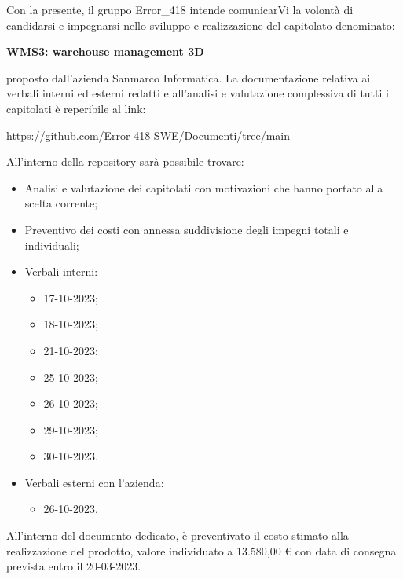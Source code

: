 \documentclass[a4paper, twoside]{article}
\begin{document}
\newpage %



\noindent
Con la presente, il gruppo Error\_418 intende comunicarVi la volontà di candidarsi e impegnarsi nello sviluppo e realizzazione del capitolato denominato:
\begin{center}
\textbf{WMS3: warehouse management 3D}
\end{center}
proposto dall'azienda Sanmarco Informatica. La documentazione relativa ai verbali interni ed 
esterni redatti e all'analisi e valutazione complessiva di tutti i capitolati è reperibile 
al link: 
\begin{center}
    \Large
\url{https://github.com/Error-418-SWE/Documenti/tree/main}
\end{center}

\vspace{0.5cm}
\noindent
All'interno della repository sarà possibile trovare:
\begin{itemize}
    \item Analisi e valutazione dei capitolati con motivazioni che hanno portato alla scelta corrente;
    \item Preventivo dei costi con annessa suddivisione degli impegni totali e individuali;
    \item Verbali interni:
    \begin{itemize}
        \item 17-10-2023;
        \item 18-10-2023;
        \item 21-10-2023;
        \item 25-10-2023;
        \item 26-10-2023;
        \item 29-10-2023;
        \item 30-10-2023.
    \end{itemize}
    \item Verbali esterni con l'azienda:
    \begin{itemize}
        \item 26-10-2023.
    \end{itemize}
\end{itemize}
All'interno del documento dedicato, è preventivato il costo stimato alla realizzazione del 
prodotto, valore individuato a 13.580,00 € con data di consegna prevista entro il 20-03-2023.
\end{document}
